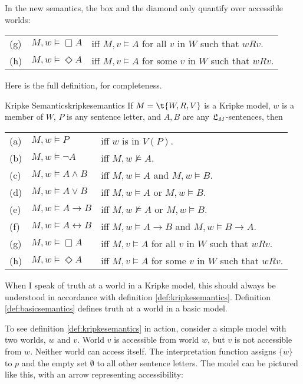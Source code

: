 \noindent%
In the new semantics, the box and the diamond only quantify over
accessible worlds:

\bigskip
\begin{tabular}{lll}
  (g) & $M,w \models \Box A$ &iff $M,v \models A$ for all $v$ in $ W$ such that $wRv$.\\
  (h) & $M,w \models \Diamond A$ &iff $M,v \models A$ for some $v$ in $ W$ such that $wRv$.
\end{tabular}
\bigskip

Here is the full definition, for completeness.

\begin{definition}{Kripke Semantics}{kripkesemantics}
  If $\Mfr = \t{W,R,V}$ is a Kripke model, $w$ is a member of $W$, $P$ is
  any sentence letter, and $A,B$ are any $\mathfrak{L}_M$-sentences, then

  \medskip
  \begin{tabular}{lll}
    (a) & $M,w \models P$ &iff $w$ is in $V(P)$.\\
    (b) & $M,w \models \neg A$ &iff $M,w \not\models A$.\\
    (c) & $M,w \models A \land B$ &iff $M,w \models A$ and $M,w \models B$.\\
    (d) & $M,w \models A \lor B$ &iff $M,w \models A$ or $M,w \models B$.\\
    (e) & $M,w \models A \to B$ &iff $M,w \not\models A$ or $M,w \models B$.\\
    (f) & $M,w \models A \leftrightarrow B$ &iff $M,w \models A\to B$ and $M,w \models B\to A$.\\
    (g) & $M,w \models \Box A$ &iff $M,v \models A$ for all $v$ in $ W$ such that $wRv$.\\
    (h) & $M,w \models \Diamond A$ &iff $M,v \models A$ for some $v$ in $ W$ such that $wRv$.
  \end{tabular}
\end{definition}
%
When I speak of truth at a world in a Kripke model, this should always be
understood in accordance with definition \ref{def:kripkesemantics}. Definition
\ref{def:basicsemantics} defines truth at a world in a basic model.

To see definition \ref{def:kripkesemantics} in action, consider a simple model
with two worlds, $w$ and $v$. World $v$ is accessible from world $w$, but $v$ is
not accessible from $w$. Neither world can access itself. The interpretation
function assigns $\{ w \}$ to $p$ and the empty set $\emptyset$ to all other
sentence letters. The model can be pictured like this, with an arrow
representing accessibility:


